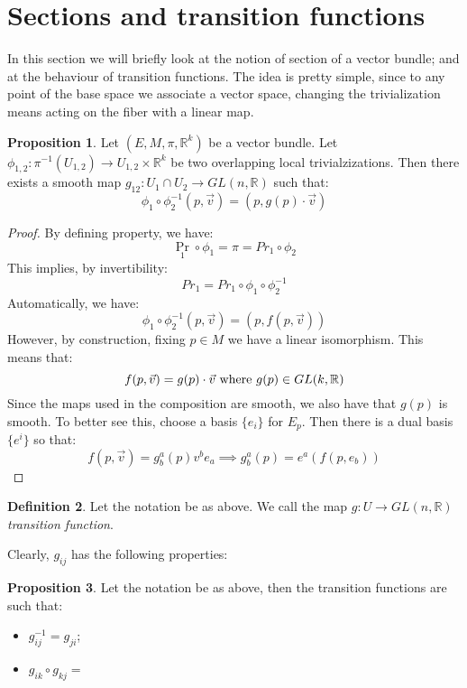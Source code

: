 \documentclass[12pt,a4paper]{report}
\theoremstyle{definition}
\newtheorem{Def}{Definition}[chapter]
\theoremstyle{Theorem}
\newtheorem{Prop}[Def]{Proposition}
\theoremstyle{definition}
\theoremstyle{definition}
\begin{document}
	\section{Sections and transition functions}
		In this section we will briefly look at the notion of section of a vector bundle; and at the behaviour of transition functions. The idea is pretty simple, since to any point of the base space we associate a vector space, changing the trivialization means acting on the fiber with a linear map.
		\begin{Prop}
			Let $(E,M,\pi,\mathbb{R}^k)$ be a vector bundle. Let $\phi_{1,2}:\pi^{-1}(U_{1,2})\rightarrow U_{1,2}\times \mathbb{R}^k$ be two overlapping local trivialzizations. Then there exists a smooth map $g_{12}:U_1\cap U_2\rightarrow GL(n,\mathbb{R})$ such that:
			$$\phi_1\circ \phi_2^{-1}(p,\vec{v})=(p,g(p)\cdot \vec{v})$$
		\end{Prop}
		\begin{proof}
			By defining property, we have:
			$$\Pr_1\circ \phi_1=\pi=Pr_1\circ \phi_2$$
			This implies, by invertibility:
			$$Pr_1=Pr_1\circ \phi_1\circ \phi_2^{-1}$$
			Automatically, we have:
			$$\phi_1\circ \phi_2^{-1}(p,\vec{v})=(p,f(p,\vec{v}))$$
			However, by construction, fixing $p\in M$ we have a linear isomorphism. This means that:
			$$f(p,\vec{v})=g(p)\cdot \vec{v}\hbox{ where }g(p)\in GL(k,\mathbb{R})$$
			Since the maps used in the composition are smooth, we also have that $g(p)$ is smooth. To better see this, choose a basis $\{e_i\}$ for $E_p$. Then there is a dual basis $\{e^i\}$ so that:
			$$f(p,\vec{v})=g^a_b(p)v^be_a\implies g^a_b(p)=e^a(f(p,e_b))$$
		\end{proof}
		\begin{Def}
			Let the notation be as above. We call the map $g:U\rightarrow GL(n,\mathbb{R})$ \textit{transition function}.
		\end{Def}
		Clearly, $g_{ij}$ has the following properties:
		\begin{Prop}
			Let the notation be as above, then the transition functions are such that:
			\begin{itemize}
				\item $g_{ij}^{-1}=g_{ji}$;
				\item $g_{ik}\circ g_{kj}=$
			\end{itemize}
		\end{Prop} 
\end{document}

